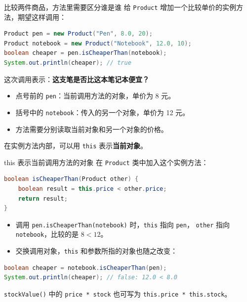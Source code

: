 \documentclass[aspectratio=169]{beamer}
\begin{document}
\begin{frame}[fragile]{比较两件商品，方法里需要区分谁是谁}
  给 \texttt{Product} 增加一个比较单价的实例方法，期望这样调用：
  \begin{lstlisting}[language=Java]
Product pen = new Product("Pen", 8.0, 20);
Product notebook = new Product("Notebook", 12.0, 10);
boolean cheaper = pen.isCheaperThan(notebook);
System.out.println(cheaper); // true
  \end{lstlisting}
  这次调用表示：\textbf{这支笔是否比这本笔记本便宜？}
  \par\medskip
  \begin{itemize}
    \item 点号前的 \texttt{pen}：当前调用方法的对象，单价为 8 元。
    \item 括号中的 \texttt{notebook}：传入的另一个对象，单价为 12 元。
    \item 方法需要分别读取\alert{当前对象}和\alert{另一个对象}的价格。
  \end{itemize}
  \medskip
  在实例方法内部，可以用 \texttt{this} 表示\textbf{当前对象}。
\end{frame}

\begin{frame}[fragile]{this 表示当前调用方法的对象}
  在 \texttt{Product} 类中加入这个实例方法：
  \begin{lstlisting}[language=Java]
boolean isCheaperThan(Product other) {
    boolean result = this.price < other.price;
    return result;
}
  \end{lstlisting}
  \begin{itemize}
    \item 调用 \texttt{pen.isCheaperThan(notebook)} 时，\texttt{this} 指向 \texttt{pen}，
      \texttt{other} 指向 \texttt{notebook}，比较的是 $8 < 12$。
    \item 交换调用对象，\texttt{this} 和参数所指的对象也随之改变：
  \end{itemize}
  \begin{lstlisting}[language=Java]
boolean cheaper = notebook.isCheaperThan(pen);
System.out.println(cheaper); // false: 12.0 < 8.0
  \end{lstlisting}
  \texttt{stockValue()} 中的 \texttt{price * stock} 也可写为 \texttt{this.price * this.stock}。
\end{frame}
\end{document}
